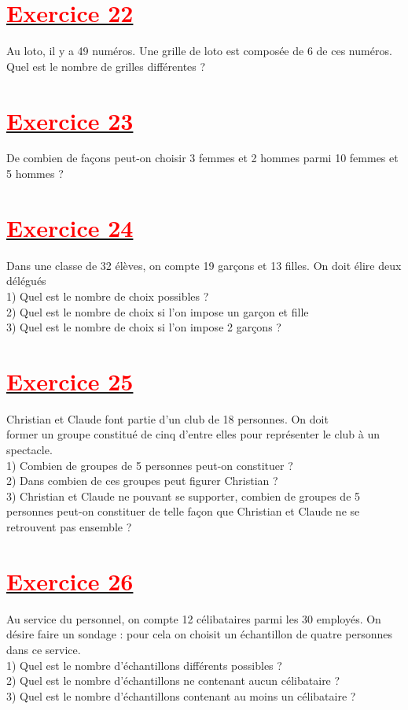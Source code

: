 \documentclass[12pt]{article}
\begin{document}
\section*{\underline{\textbf{\textcolor{red}{Exercice 22}}}}
Au loto, il y a 49 numéros. Une grille de loto est composée de 6 de ces numéros. Quel est le nombre de grilles
différentes ?
\section*{\underline{\textbf{\textcolor{red}{Exercice 23}}}}
De combien de façons peut-on choisir 3 femmes et 2 hommes parmi 10 femmes et 5 hommes ?
\section*{\underline{\textbf{\textcolor{red}{Exercice 24}}}}
Dans une classe de 32 élèves, on compte 19 garçons et 13 filles. On doit élire deux délégués\\
1) Quel est le nombre de choix possibles ?\\
2) Quel est le nombre de choix si l’on impose un garçon et fille\\
3) Quel est le nombre de choix si l’on impose 2 garçons ?\\
\section*{\underline{\textbf{\textcolor{red}{Exercice 25}}}}
Christian et Claude font partie d’un club de 18 personnes. On doit\\ former un groupe constitué de cinq d’entre elles pour représenter le club à un spectacle.\\
1) Combien de groupes de 5 personnes peut-on constituer ?\\
2) Dans combien de ces groupes peut figurer Christian ?\\
3) Christian et Claude ne pouvant se supporter, combien de groupes de 5 personnes peut-on constituer de telle façon que Christian et Claude ne se retrouvent pas ensemble ?\\
\section*{\underline{\textbf{\textcolor{red}{Exercice 26}}}}
Au service du personnel, on compte 12 célibataires parmi les 30 employés. On désire faire un sondage : pour cela on choisit un échantillon de quatre personnes dans ce service.\\
1) Quel est le nombre d’échantillons différents possibles ?\\
2) Quel est le nombre d’échantillons ne contenant aucun célibataire ?\\
3) Quel est le nombre d’échantillons contenant au moins un célibataire ?\\
\end{document}
